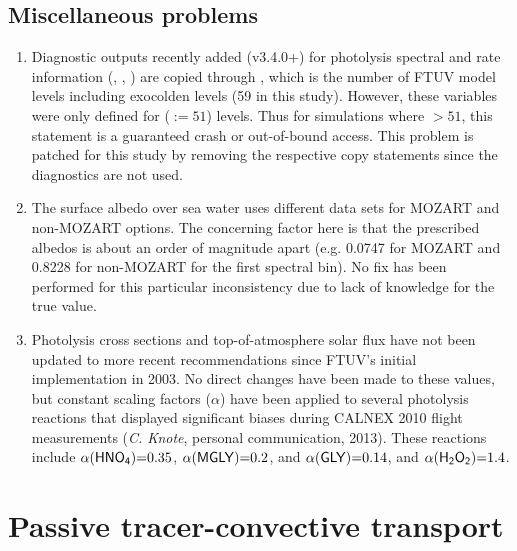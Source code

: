 \subsection{Miscellaneous problems}\label{a-ssec:bug/ftuv/misc}
\begin{enumerate}
	\item Diagnostic outputs recently added (v3.4.0+) for photolysis spectral and rate information (, , ) are copied through , which is the number of FTUV model levels including exocolden levels (59 in this study). However, these variables were only defined for ($:=51$) levels. Thus for simulations where $>51$, this statement is a guaranteed crash or out-of-bound access. This problem is patched for this study by removing the respective copy statements since the diagnostics are not used.
	\item The surface albedo over sea water uses different data sets for MOZART and non-MOZART options. The concerning factor here is that the prescribed albedos is about an order of magnitude apart (e.g. 0.0747 for MOZART and 0.8228 for non-MOZART for the first spectral bin). No fix has been performed for this particular inconsistency due to lack of knowledge for the true value.
	\item Photolysis cross sections and top-of-atmosphere solar flux have not been updated to more recent recommendations since FTUV's initial implementation in 2003. No direct changes have been made to these values, but constant scaling factors ($\alpha$) have been applied to several photolysis reactions that displayed significant biases during CALNEX 2010 flight measurements (\textit{C. Knote}, personal communication, 2013). These reactions include $\alpha(\chem{HNO_4})=0.35$, $\alpha(\chem{MGLY})=0.2$, and $\alpha(\chem{GLY})=0.14$, and $\alpha(\chem{H_2O_2})=1.4$.
\end{enumerate}

\section{Passive tracer-convective transport}\label{a-sec:bug/tracer}